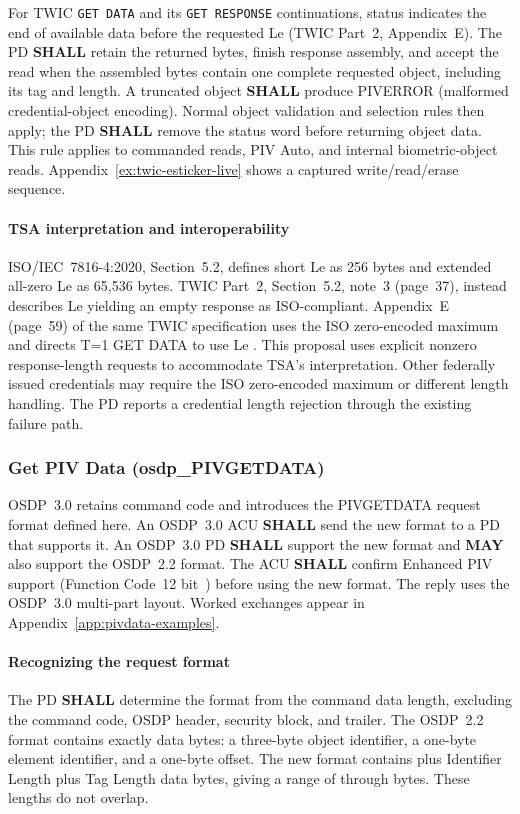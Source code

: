 For TWIC \texttt{GET DATA} and its \texttt{GET RESPONSE} continuations,
status  indicates the end of available data before the requested
Le (TWIC Part~2, Appendix~E). The PD \textbf{SHALL} retain the returned bytes,
finish response assembly, and accept the read when the assembled bytes contain
one complete requested object, including its tag and length. A truncated object
\textbf{SHALL} produce PIVERROR  (malformed credential-object
encoding). Normal object validation and selection rules then apply; the PD
\textbf{SHALL} remove the status word before returning object data.
This rule applies to commanded reads, PIV Auto, and internal biometric-object reads.
Appendix~\ref{ex:twic-esticker-live} shows a captured write/read/erase sequence.

\paragraph{TSA interpretation and interoperability}
ISO/IEC~7816-4:2020, Section~5.2, defines short Le  as 256 bytes and
extended all-zero Le as 65,536 bytes. TWIC Part~2, Section~5.2, note~3
(page~37), instead describes Le  yielding an empty 
response as ISO-compliant. Appendix~E (page~59) of the same TWIC specification
uses the ISO zero-encoded maximum and directs T=1 GET DATA to use Le
. This proposal uses explicit nonzero response-length requests to
accommodate TSA's interpretation. Other federally issued credentials may require
the ISO zero-encoded maximum or different length handling. The PD reports a
credential length rejection through the existing failure path.

\subsubsection{Get PIV Data (osdp\_PIVGETDATA)}\label{sec:pivdata}

OSDP~3.0 retains command code  and introduces the PIVGETDATA
request format defined here. An OSDP~3.0 ACU \textbf{SHALL} send the new
format to a PD that supports it. An OSDP~3.0 PD \textbf{SHALL} support
the new format and \textbf{MAY} also support the OSDP~2.2 format.
The ACU \textbf{SHALL} confirm Enhanced PIV support (Function Code~12
bit~) before using the new format. The reply uses the
OSDP~3.0 multi-part layout. Worked exchanges appear in
Appendix~\ref{app:pivdata-examples}.

\paragraph{Recognizing the request format}
The PD \textbf{SHALL} determine the format from the command data length,
excluding the command code, OSDP header, security block, and trailer.
The OSDP~2.2 format contains exactly  data bytes: a three-byte
object identifier, a one-byte element identifier, and a one-byte offset.
The new format contains  plus Identifier Length plus Tag Length
data bytes, giving a range of  through  bytes.
These lengths do not overlap.

